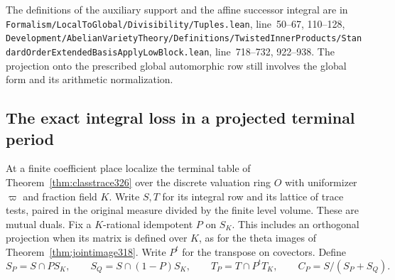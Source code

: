 \documentclass[a4paper,11pt]{article}
\theoremstyle{definition}
\theoremstyle{remark}
\newcommand{\srcloc}[2]{{\small\nolinkurl{#1.lean}}, line~#2}
\numberwithin{equation}{section}
\begin{document}
The definitions of the auxiliary support and the affine
successor integral are in
\srcloc{Formalism/LocalToGlobal/Divisibility/Tuples}{50--67, 110--128},
\srcloc{Development/AbelianVarietyTheory/Definitions/TwistedInnerProducts/StandardOrderExtendedBasisApplyLowBlock}{718--732, 922--938}.
The projection onto the prescribed global automorphic row
still involves the global form and its arithmetic normalization.

\subsection{The exact integral loss in a projected terminal period}\label{nav:VIII-67}
At a finite coefficient place localize the terminal table
of Theorem~\ref{thm:classtrace326} over the discrete
valuation ring \(O\) with uniformizer \(\varpi\) and
fraction field \(K\). Write \(S,T\) for its integral row
and its lattice of trace tests, paired in the original
measure divided by the finite level volume. These are
mutual duals. Fix a \(K\)-rational idempotent \(P\) on
\(S_K\). This includes an orthogonal projection when
its matrix is defined over \(K\), as for the theta images
of Theorem~\ref{thm:jointimage318}. Write \(P^t\) for the
transpose on covectors. Define
\[
 S_P=S\cap P S_K,\qquad S_Q=S\cap(1-P)S_K,\qquad
 T_P=T\cap P^t T_K,\qquad C_P=S/(S_P+S_Q).
\]
\end{document}
